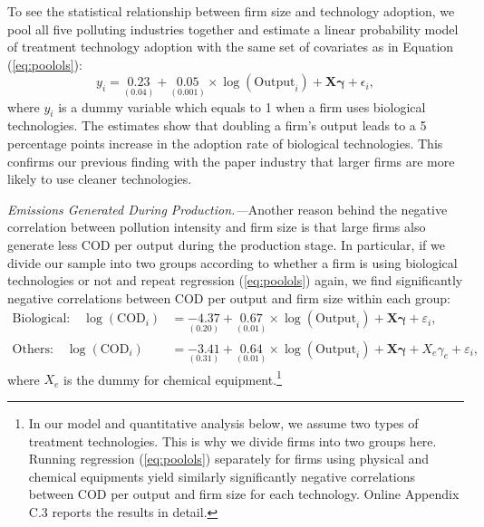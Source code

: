 \documentclass[AEJ]{AEA}
\renewcommand{\vec}[1]{\ensuremath{\mathbf{#1}}}
\begin{document}
To see the statistical relationship between firm size and technology adoption, we pool all five polluting industries together and estimate a linear probability model of treatment technology adoption with the same set of covariates as in Equation (\ref{eq:poolols}):
\begin{equation*}
    y_i = \underset{(0.04)}{0.23} + \underset{(0.001)}{0.05} \times \log (\text{Output}_i) + \vec{X} \vec{\gamma} + \epsilon_i,
\end{equation*}
where $y_i$ is a dummy variable which equals to 1 when a firm uses biological technologies. The estimates show that doubling a firm's output leads to a 5 percentage points increase in the adoption rate of biological technologies. This confirms our previous finding with the paper industry that larger firms are more likely to use cleaner technologies.

\textit{Emissions Generated During Production.---}Another reason behind the negative correlation between pollution intensity and firm size is that large firms also generate less COD per output during the production stage. In particular, if we divide our sample into two groups according to whether a firm is using biological technologies or not and repeat regression (\ref{eq:poolols}) again, we find significantly negative correlations between COD per output and firm size within each group:
\begin{align}
\label{eq:poolols_biological}
    \text{Biological:} \quad \log (\text{COD}_i) &= \underset{(0.20)}{-4.37} + \underset{(0.01)}{0.67} \times \log (\text{Output}_i) + \vec{X} \vec{\gamma} + \varepsilon_i, \\
\label{eq:poolols_others}
    \text{Others:} \quad \log (\text{COD}_i) &= \underset{(0.31)}{-3.41} + \underset{(0.01)}{0.64} \times \log (\text{Output}_i) + \vec{X} \vec{\gamma} + X_e \gamma_e + \varepsilon_i,
\end{align}
where $X_e$ is the dummy for chemical equipment.\footnote{In our model and quantitative analysis below, we assume two types of treatment technologies. This is why we divide firms into two groups here. Running regression (\ref{eq:poolols}) separately for firms using physical and chemical equipments yield similarly significantly negative correlations between COD per output and firm size for each technology. Online Appendix C.3 reports the results in detail.}
\end{document}
